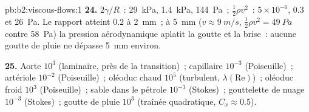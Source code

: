 \begin{solution}{pb:b2:viscous-flows:1}
\textbf{24.} $2\gamma/R$~: \qty{29}{kPa}, \qty{1.4}{kPa}, \qty{144}{Pa}~;  $\tfrac12\rho v^2$~: $5 \times 10^{-6}$, $0.3$ et \qty{26}{Pa}. Le rapport
atteint $0.2$ à \qty{2}{mm}~; à \qty{5}{mm} ($v \approx \qty{9}{m/s}$, $\tfrac12\rho v^2 =
\qty{49}{Pa}$ contre \qty{58}{Pa}) la pression aérodynamique aplatit la
goutte et la brise~: aucune goutte de pluie ne dépasse \qty{5}{mm} environ.

\textbf{25.} Aorte $10^3$ (laminaire, près de la transition)~; capillaire $10^{-3}$
(Poiseuille)~; artériole $10^{-2}$ (Poiseuille)~; oléoduc chaud $10^5$
(turbulent, $\lambda(\mathrm{Re})$)~; oléoduc froid $10^3$ (Poiseuille)~; sable dans le
pétrole $10^{-3}$ (Stokes)~; gouttelette de nuage $10^{-3}$ (Stokes)~; goutte de pluie $10^3$
(traînée quadratique, $C_x \approx 0.5$).
\end{solution}
